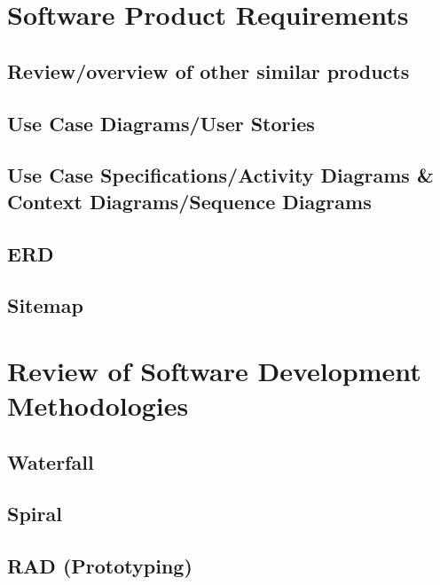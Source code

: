 \documentclass[12pt,a4paper]{article}
\begin{document}
\section{Software Product Requirements}

\subsection{Review/overview of other similar products}

\subsection{Use Case Diagrams/User Stories}

\subsection{Use Case Specifications/Activity Diagrams \& Context Diagrams/Sequence Diagrams}

\subsection{ERD}

\subsection{Sitemap}

\clearpage
\section{Review of Software Development Methodologies}

\subsection{Waterfall}

\subsection{Spiral}

\subsection{RAD (Prototyping)}
\end{document}
